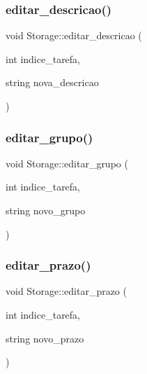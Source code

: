 \subsubsection{\texorpdfstring{editar\+\_\+descricao()}{editar\_descricao()}}
{\footnotesize\ttfamily void Storage\+::editar\+\_\+descricao (\begin{DoxyParamCaption}\item[{int}]{indice\+\_\+tarefa,  }\item[{string}]{nova\+\_\+descricao }\end{DoxyParamCaption})}

\mbox{\label{classStorage_a34a852bccbf913731f17a654e6e97c5a}} 
\subsubsection{\texorpdfstring{editar\+\_\+grupo()}{editar\_grupo()}}
{\footnotesize\ttfamily void Storage\+::editar\+\_\+grupo (\begin{DoxyParamCaption}\item[{int}]{indice\+\_\+tarefa,  }\item[{string}]{novo\+\_\+grupo }\end{DoxyParamCaption})}

\mbox{\label{classStorage_a593548cb2b9ee3e570dae32b55140a0c}} 
\subsubsection{\texorpdfstring{editar\+\_\+prazo()}{editar\_prazo()}}
{\footnotesize\ttfamily void Storage\+::editar\+\_\+prazo (\begin{DoxyParamCaption}\item[{int}]{indice\+\_\+tarefa,  }\item[{string}]{novo\+\_\+prazo }\end{DoxyParamCaption})}

\mbox{\label{classStorage_a15c3a41053de23043a4b16c751515804}} 

